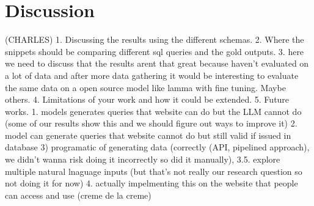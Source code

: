 \section{Discussion}






(CHARLES)
1. Discussing the results using the different schemas.
2. Where the snippets should be comparing different sql queries and the gold outputs.
3. here we need to discuss that the results arent that great because haven't evaluated on a lot of data and after more data gathering it would be interesting to evaluate the same data on a open source model like lamma with fine tuning. Maybe others.
4. Limitations of your work and how it could be extended.
5. Future works. 1. models generates queries that website can do but the LLM cannot do (some of our results show this and we should figure out ways to improve it) 2. model can generate queries that website cannot do but still valid if issued in database 3) programatic of generating data (correctly (API, pipelined approach), we didn't wanna risk doing it incorrectly so did it manually), 3.5. explore multiple natural lnaguage inputs (but that's not really our research question so not doing it for now) 4. actually impelmenting this on the website that people can access and use (creme de la creme)